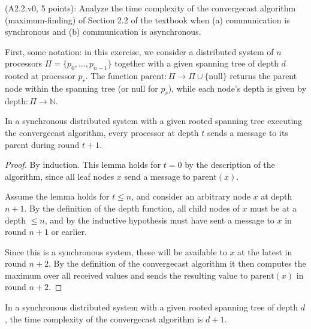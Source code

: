 \begin{Exc}{(A2.2.v0, 5 points):}
Analyze the time complexity of the convergecast algorithm
(maximum-finding) of Section 2.2 of the textbook when (a) communication is
synchronous and (b) communication is asynchronous.
\end{Exc}

\begin{comment}
Hint: For the synchronous case, prove that during round t + 1, a processor at
height t sends a message to its parent. For the asynchronous case, prove that
by time t, a processor at height t has sent a message to its parent.
\end{comment}

\newcommand{\prnt}[1]{\text{parent}(#1)}
\newcommand{\dpth}[1]{\text{depth}(#1)}

First, some notation: in this exercise, we consider a distributed system of $n$
processors $\Pi=\{p_0,\dots,p_{n-1}\}$ together with a given spanning tree of depth
$d$ rooted at processor $p_r$. The function
$\text{parent}: \Pi \rightarrow \Pi \cup \{ \text{null} \}$ returns the parent node
within the spanning tree (or null for $p_r$), while each node's depth is given by
$\text{depth}: \Pi \rightarrow \mathbb{N}$.

\begin{lemma} \label{lemma:1sync}
In a synchronous distributed system with a given rooted spanning tree executing the convergecast
algorithm, every processor at depth $t$ sends a message to its parent during round $t + 1$.
\end{lemma}

\begin{proof}
By induction. This lemma holds for $t = 0$ by the description of the algorithm,
since all leaf nodes $x$ send a message to $\prnt{x}$.

Assume the lemma holds for $t \leq n$, and consider an arbitrary node $x$ at depth
$n + 1$. By the definition of the depth function, all child nodes of $x$ must be at
a depth $\leq n$, and by the inductive hypothesis must have sent a message to
$x$ in round $n + 1$ or earlier.

Since this is a synchronous system, these will be available
to $x$ at the latest in round $n + 2$. By the definition of the
convergecast algorithm it then computes the maximum over all received values and
sends the resulting value to $\prnt{x}$ in round $n + 2$.
\end{proof}

\begin{theorem}
In a synchronous distributed system with a given rooted spanning tree of depth $d$, the time
complexity of the convergecast algorithm is $d + 1$.
\end{theorem}

